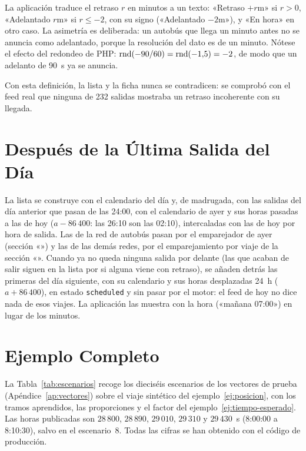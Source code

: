 \noindent La aplicación traduce el retraso $r$ en minutos a un texto: «Retraso $+r$m» si $r>0$, «Adelantado $r$m» si
$r\le-2$, con su signo («Adelantado $-2$m»), y «En hora» en otro caso. La asimetría es deliberada: un autobús que llega un minuto antes no se anuncia como
adelantado, porque la resolución del dato es de un minuto. Nótese el efecto del redondeo de PHP:
$\operatorname{rnd}(-90/60)=\operatorname{rnd}(-1{,}5)=-2$, de modo que un adelanto de 90~s ya se anuncia.

Con esta definición, la lista y la ficha nunca se contradicen: se comprobó con el feed real que ninguna de 232 salidas
mostraba un retraso incoherente con su llegada.

\section{Después de la Última Salida del Día}
\label{sec:ultima-salida}

La lista se construye con el calendario del día y, de madrugada, con las salidas del día anterior que pasan de las
24:00, con el calendario de ayer y sus horas pasadas a las de hoy ($a-86\,400$: las 26:10 son las 02:10), intercaladas
con las de hoy por hora de salida. Las de la red de autobús pasan por el emparejador de ayer (sección
«») y las de las demás redes, por el emparejamiento por viaje de la sección
«». Cuando ya no queda ninguna salida por delante (las que acaban de salir siguen en la lista
por si alguna viene con retraso), se añaden detrás las primeras del día siguiente, con su calendario y sus horas
desplazadas 24~h ($a+86\,400$), en estado \texttt{scheduled} y sin pasar por el motor: el feed de hoy no dice nada de
esos viajes. La aplicación las muestra
con la hora («mañana 07:00») en lugar de los minutos.

\section{Ejemplo Completo}
\label{sec:ejemplo-completo}

La Tabla~\ref{tab:escenarios} recoge los dieciséis escenarios de los vectores de prueba (Apéndice~\ref{ap:vectores})
sobre el viaje sintético del ejemplo~\ref{ej:posicion}, con los tramos aprendidos, las proporciones y el factor del
ejemplo~\ref{ej:tiempo-esperado}. Las horas publicadas son $28\,800$, $28\,890$, $29\,010$, $29\,310$ y $29\,430$~s
(8:00:00 a 8:10:30), salvo en el escenario~8. Todas las cifras se han obtenido con el código de producción.

